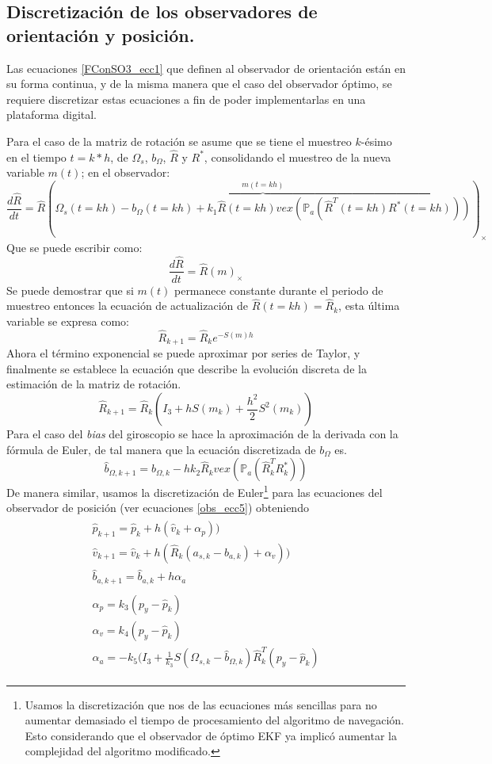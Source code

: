 \documentclass[10pt]{report}
\numberwithin{equation}{chapter}
\numberwithin{algorithm}{chapter}
\newcommand{\deriv}[1]{\frac{d #1}{dt}}
\begin{document}
\subsection{Discretización de los observadores de orientación y posición.}
Las ecuaciones \eqref{FConSO3_ecc1} que definen al observador de orientación están en su forma continua, y de la misma manera que el caso del observador óptimo, se requiere discretizar estas ecuaciones a fin de poder implementarlas en una plataforma digital.\par
Para el caso de la matriz de rotación se asume que se tiene el muestreo $k$-ésimo en el tiempo $t=k*h$, de $\Omega_s$, $b_\Omega$, $\hat{R}$ y $R^*$, consolidando el muestreo de la nueva variable $m(t)$; en el observador:
\footnotesize{$$\deriv{\hat{R}}=\hat{R}\left(\overbrace{\Omega_{s}(t=kh)-b_{\Omega}(t=kh)+ k_1\hat{R}(t=kh) vex\left(\mathbb{P}_a\left(\hat{R}^T(t=kh)R^*(t=kh)\right)\right)}^{m (t=kh)}\right)_\times$$}\normalsize
Que se puede escribir como:
$$\deriv{\hat{R}}=\hat{R}(m)_\times$$
Se puede demostrar que si $m(t)$ permanece constante durante el periodo de muestreo entonces la ecuación de actualización de $\hat{R}(t=kh)=\hat{R}_k$, esta última variable se expresa como:
$$\hat{R}_{k+1}=\hat{R}_ke^{-S(m)h}$$ Ahora el término exponencial se puede aproximar por series de Taylor, y finalmente se establece la ecuación que describe la evolución discreta de la estimación de la matriz de rotación.
\begin{equation}\label{diseobs_ecc1}
\hat{R}_{k+1}=\hat{R}_k\left(I_3+hS(m_k)+\frac{h^2}{2}S^2(m_k)\right)
\end{equation}
Para el caso del \emph{bias} del giroscopio se hace la aproximación de la derivada con la fórmula de Euler, de tal manera que la ecuación discretizada de $b_\Omega$ es. 
\begin{equation}\label{diseobs_ecc100}
\hat{b}_{\Omega,k+1}=\hat{b}_{\Omega,k}-hk_2\hat{R}_kvex\left(\mathbb{P}_a(\hat{R}_k^TR^*_k)\right)
\end{equation}
De manera similar, usamos la discretización de Euler\footnote{Usamos la discretización que nos de las ecuaciones más sencillas para no aumentar demasiado el tiempo de procesamiento del algoritmo de navegación. Esto considerando que el observador de óptimo EKF ya implicó aumentar la complejidad del algoritmo modificado.} para las ecuaciones del observador de posición (ver ecuaciones \eqref{obs_ecc5}) obteniendo 
\begin{gather}\label{diseobs_ecc2}
\begin{array}{c}
\hat{p}_{k+1}=\hat{p}_{k}+h(\hat{v}_k+\alpha_p))\\
\hat{v}_{k+1}=\hat{v}_{k}+h(\hat{R}_k(a_{s,k}-b_{a,k})+\alpha_v))\\
\hat{b}_{a,k+1}=\hat{b}_{a,k}+h\alpha_a
\end{array}\\\label{diseobs_ecc3}
\begin{array}{c}
\alpha_{p}=k_3(p_y-\hat{p}_{k})\\
\alpha_{v}=k_4(p_y-\hat{p}_{k})\\
\alpha_{a}=-k_5(I_3+\frac{1}{k_3}S(\Omega_{s,k}-\hat {b}_{\Omega,k})\hat{R}_k^T(p_y-\hat{p}_k)
\end{array}
\end{gather}
\end{document}
